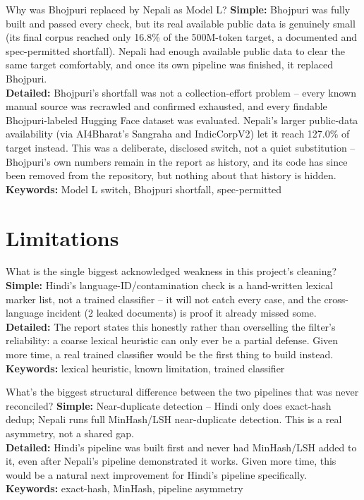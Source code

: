 \documentclass[11pt]{report}
\begin{document}
\begin{qabox}{Why was Bhojpuri replaced by Nepali as Model L?}
\textbf{Simple:} Bhojpuri was fully built and passed every check, but its
real available public data is genuinely small (its final corpus reached
only 16.8\% of the 500M-token target, a documented and spec-permitted
shortfall). Nepali had enough available public data to clear the same
target comfortably, and once its own pipeline was finished, it replaced
Bhojpuri.\\
\textbf{Detailed:} Bhojpuri's shortfall was not a collection-effort
problem -- every known manual source was recrawled and confirmed
exhausted, and every findable Bhojpuri-labeled Hugging Face dataset was
evaluated. Nepali's larger public-data availability (via AI4Bharat's
Sangraha and IndicCorpV2) let it reach 127.0\% of target instead. This
was a deliberate, disclosed switch, not a quiet substitution --
Bhojpuri's own numbers remain in the report as history, and its code has
since been removed from the repository, but nothing about that history is
hidden.\\
\textbf{Keywords:} Model L switch, Bhojpuri shortfall, spec-permitted
\end{qabox}

\section{Limitations}

\begin{qabox}{What is the single biggest acknowledged weakness in this
project's cleaning?}
\textbf{Simple:} Hindi's language-ID/contamination check is a hand-written
lexical marker list, not a trained classifier -- it will not catch every
case, and the cross-language incident (2 leaked documents) is proof it
already missed some.\\
\textbf{Detailed:} The report states this honestly rather than
overselling the filter's reliability: a coarse lexical heuristic can only
ever be a partial defense. Given more time, a real trained classifier
would be the first thing to build instead.\\
\textbf{Keywords:} lexical heuristic, known limitation, trained classifier
\end{qabox}

\begin{qabox}{What's the biggest structural difference between the two
pipelines that was never reconciled?}
\textbf{Simple:} Near-duplicate detection -- Hindi only does exact-hash
dedup; Nepali runs full MinHash/LSH near-duplicate detection. This is a
real asymmetry, not a shared gap.\\
\textbf{Detailed:} Hindi's pipeline was built first and never had
MinHash/LSH added to it, even after Nepali's pipeline demonstrated it
works. Given more time, this would be a natural next improvement for
Hindi's pipeline specifically.\\
\textbf{Keywords:} exact-hash, MinHash, pipeline asymmetry
\end{qabox}
\end{document}
